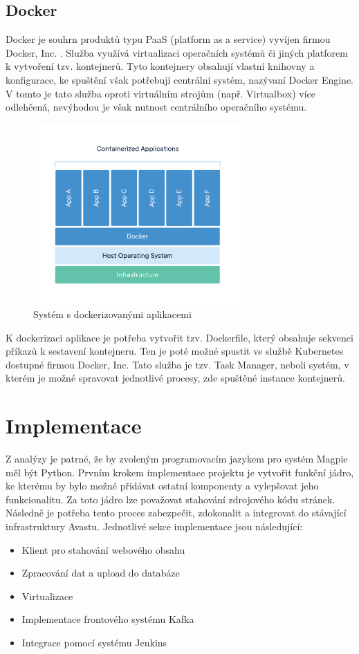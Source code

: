 \documentclass[thesis=M,czech,hidelinks]{FITthesis}[2013/05/06]
\begin{document}
\section{Docker}\label{sec:docker}
Docker je souhrn produktů typu PaaS (platform as a service) vyvíjen firmou Docker, Inc. \cite{docker}. Služba využívá virtualizaci operačních systémů či jiných platforem k vytvoření tzv. kontejnerů. Tyto kontejnery obsahují vlastní knihovny a konfigurace, ke spuštění však potřebují centrální systém, nazývaní Docker Engine. V tomto je tato služba oproti virtuálním strojům (např. Virtualbox) více odlehčená, nevýhodou je však nutnost centrálního operačního systému. 

\begin{figure}[h]
	\centering
	\includegraphics[width=8cm]{pictures/docker.png}
	\caption{Systém s dockerizovanými aplikacemi \cite{docker}}
	\label{fig:docker}
\end{figure}

K dockerizaci aplikace je potřeba vytvořit tzv. Dockerfile, který obsahuje sekvenci příkazů k sestavení kontejneru. Ten je poté možné spustit ve službě Kubernetes dostupné firmou Docker, Inc. Tato služba je tzv. Task Manager, neboli systém, v kterém je možné spravovat jednotlivé procesy, zde spuštěné instance kontejnerů.


\chapter{Implementace}
Z analýzy je patrné, že by zvoleným programovacím jazykem pro systém Magpie měl být Python. Prvním krokem implementace projektu je vytvořit funkční jádro, ke kterému by bylo možné přidávat ostatní komponenty a vylepšovat jeho funkcionalitu. Za toto jádro lze považovat stahování zdrojového kódu stránek. Následně je potřeba tento proces zabezpečit, zdokonalit a integrovat do stávající infrastruktury Avastu. Jednotlivé sekce implementace jsou následující:
\begin{itemize}
	\item Klient pro stahování webového obsahu
	\item Zpracování dat a upload do databáze
	\item Virtualizace 
	\item Implementace frontového systému Kafka
	\item Integrace pomocí systému Jenkins
\end{itemize} 
\end{document}
